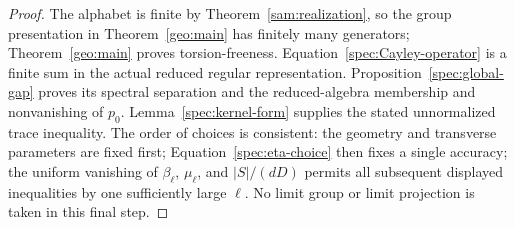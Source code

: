 \begin{proof}
The alphabet is finite by Theorem~\ref{sam:realization}, so the group
presentation in Theorem~\ref{geo:main} has finitely many generators;
Theorem~\ref{geo:main} proves torsion-freeness.  Equation~\eqref{spec:Cayley-operator}
is a finite sum in the actual reduced regular representation.
Proposition~\ref{spec:global-gap} proves its spectral separation and
the reduced-algebra membership and nonvanishing of $p_0$.
Lemma~\ref{spec:kernel-form} supplies the stated unnormalized trace
inequality.  The order of choices is consistent: the geometry and
transverse parameters are fixed first; Equation~\eqref{spec:eta-choice}
then fixes a single accuracy; the uniform vanishing of
$\beta_\ell$, $\mu_\ell$, and $|S|/(dD)$ permits all subsequent displayed
inequalities by one sufficiently large $\ell$.  No limit group or
limit projection is taken in this final step.
\end{proof}
